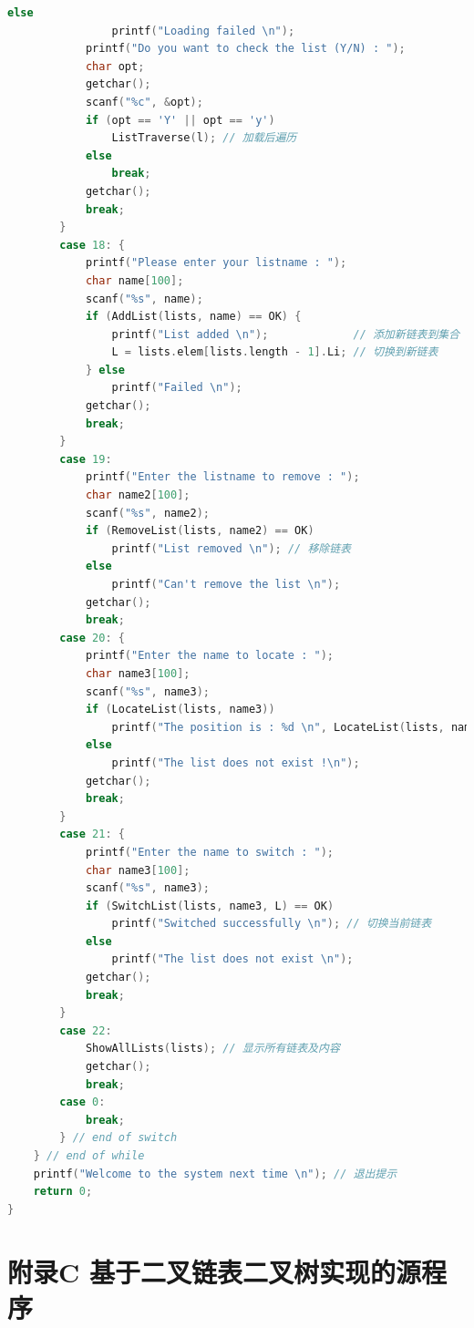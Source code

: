 \documentclass[supercite]{Experimental_Report}
\theoremstyle{definition}
\begin{document}
\begin{lstlisting}[language=c]
            else
                printf("Loading failed \n");
            printf("Do you want to check the list (Y/N) : ");
            char opt;
            getchar();
            scanf("%c", &opt);
            if (opt == 'Y' || opt == 'y')
                ListTraverse(l); // 加载后遍历
            else
                break;
            getchar();
            break;
        }
        case 18: {
            printf("Please enter your listname : ");
            char name[100];
            scanf("%s", name);
            if (AddList(lists, name) == OK) {
                printf("List added \n");             // 添加新链表到集合
                L = lists.elem[lists.length - 1].Li; // 切换到新链表
            } else
                printf("Failed \n");
            getchar();
            break;
        }
        case 19:
            printf("Enter the listname to remove : ");
            char name2[100];
            scanf("%s", name2);
            if (RemoveList(lists, name2) == OK)
                printf("List removed \n"); // 移除链表
            else
                printf("Can't remove the list \n");
            getchar();
            break;
        case 20: {
            printf("Enter the name to locate : ");
            char name3[100];
            scanf("%s", name3);
            if (LocateList(lists, name3))
                printf("The position is : %d \n", LocateList(lists, name3)); // 查找链表在集合中的位置
            else
                printf("The list does not exist !\n");
            getchar();
            break;
        }
        case 21: {
            printf("Enter the name to switch : ");
            char name3[100];
            scanf("%s", name3);
            if (SwitchList(lists, name3, L) == OK)
                printf("Switched successfully \n"); // 切换当前链表
            else
                printf("The list does not exist \n");
            getchar();
            break;
        }
        case 22:
            ShowAllLists(lists); // 显示所有链表及内容
            getchar();
            break;
        case 0:
            break;
        } // end of switch
    } // end of while
    printf("Welcome to the system next time \n"); // 退出提示
    return 0;
}
\end{lstlisting}

\newpage
\section{附录C 基于二叉链表二叉树实现的源程序}
\end{document}
